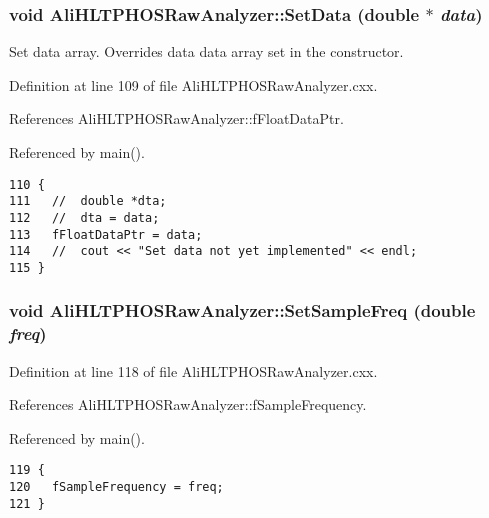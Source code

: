 \subsubsection{\setlength{\rightskip}{0pt plus 5cm}void Ali\-HLTPHOSRaw\-Analyzer::Set\-Data (double $\ast$ {\em data})\hspace{0.3cm}{\tt  [inherited]}}\label{classAliHLTPHOSRawAnalyzer_AliHLTPHOSRawAnalyzerPeakFindera12}


Set data array. Overrides data data array set in the constructor. 

Definition at line 109 of file Ali\-HLTPHOSRaw\-Analyzer.cxx.

References Ali\-HLTPHOSRaw\-Analyzer::f\-Float\-Data\-Ptr.

Referenced by main().

\footnotesize\begin{verbatim}110 {
111   //  double *dta;
112   //  dta = data;
113   fFloatDataPtr = data;
114   //  cout << "Set data not yet implemented" << endl;
115 }
\end{verbatim}\normalsize 


\subsubsection{\setlength{\rightskip}{0pt plus 5cm}void Ali\-HLTPHOSRaw\-Analyzer::Set\-Sample\-Freq (double {\em freq})\hspace{0.3cm}{\tt  [inherited]}}\label{classAliHLTPHOSRawAnalyzer_AliHLTPHOSRawAnalyzerPeakFindera13}




Definition at line 118 of file Ali\-HLTPHOSRaw\-Analyzer.cxx.

References Ali\-HLTPHOSRaw\-Analyzer::f\-Sample\-Frequency.

Referenced by main().

\footnotesize\begin{verbatim}119 {
120   fSampleFrequency = freq;
121 }
\end{verbatim}\normalsize 


